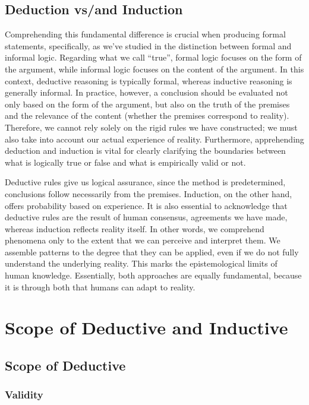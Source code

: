 \documentclass[12pt,a4paper,openany]{article}
\begin{document}
\subsection{Deduction vs/and Induction}\label{deduction-vsand-induction}

Comprehending this fundamental difference is crucial when producing
formal statements, specifically, as we've studied in the distinction
between formal and informal logic. Regarding what we call ``true'',
formal logic focuses on the form of the argument, while informal logic
focuses on the content of the argument. In this context, deductive
reasoning is typically formal, whereas inductive reasoning is generally
informal. In practice, however, a conclusion should be evaluated not
only based on the form of the argument, but also on the truth of the
premises and the relevance of the content (whether the premises
correspond to reality). Therefore, we cannot rely solely on the rigid
rules we have constructed; we must also take into account our actual
experience of reality. Furthermore, apprehending deduction and induction
is vital for clearly clarifying the boundaries between what is logically
true or false and what is empirically valid or not.

Deductive rules give us logical assurance, since the method is
predetermined, conclusions follow necessarily from the premises.
Induction, on the other hand, offers probability based on experience. It
is also essential to acknowledge that deductive rules are the result of
human consensus, agreements we have made, whereas induction reflects
reality itself. In other words, we comprehend phenomena only to the
extent that we can perceive and interpret them. We assemble patterns to
the degree that they can be applied, even if we do not fully understand
the underlying reality. This marks the epistemological limits of human
knowledge. Essentially, both approaches are equally fundamental, because
it is through both that humans can adapt to reality.


\section{Scope of Deductive and Inductive }


\subsection {Scope of Deductive}\label{scope-of-deductive}
\subsubsection{Validity}\label{validity}
\end{document}
